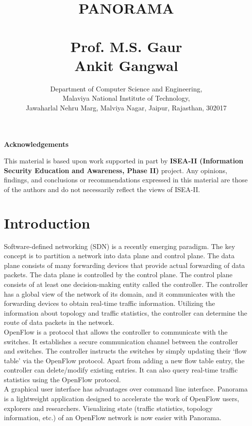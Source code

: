 \documentclass[11pt,a4paper]{report}
\begin{document}
	\pagestyle{empty}
	\title{{\Huge \textbf{P{\LARGE ANORAMA}}}\\~\\Prof. M.S. Gaur\\Ankit Gangwal}
	\author{Department of Computer Science and Engineering,
			\\Malaviya National Institute of Technology,
			\\Jawaharlal Nehru Marg, Malviya Nagar, Jaipur, Rajasthan, 302017}
	\date{}
	\maketitle 
	\begin{center}
		\LARGE{\textbf{Acknowledgements}}\\[1cm]
	\end{center}
	\large{This material is based upon work supported in part by \textbf{ISEA-II (Information Security Education and Awareness, Phase II)} project. Any opinions, findings, and conclusions or recommendations expressed in this material are those of the authors and do not necessarily reflect the views of ISEA-II.}
	\tableofcontents
	\chapter{Introduction}
	Software-defined networking (SDN) \cite{jarraya2014survey, nunes2014survey} is a recently emerging paradigm. The key concept is to partition a network into data plane and control plane. The data plane consists of many forwarding devices that provide actual forwarding of data packets. The data plane is controlled by the control plane. The control plane consists of at least one decision-making entity called the controller. The controller has a global view of the network of its domain, and it communicates with the forwarding devices to obtain real-time traffic information. Utilizing the information about topology and traffic statistics, the controller can determine the route of data packets in the network.\\
	OpenFlow \cite{mckeown2008openflow} is a protocol that allows the controller to communicate with the switches. It establishes a secure communication channel between the controller and switches. The controller instructs the switches by simply updating their `flow table' via the OpenFlow protocol. Apart from adding a new flow table entry, the controller can delete/modify existing entries. It can also query real-time traffic statistics using the OpenFlow protocol.\\
	A graphical user interface has advantages over command line interface. Panorama is a lightweight application designed to accelerate the work of OpenFlow users, explorers and researchers. Visualizing state (traffic statistics, topology information, etc.) of an OpenFlow network is now easier with Panorama.
\end{document}
